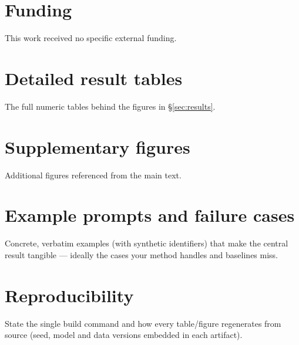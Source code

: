 \documentclass[11pt]{article}
\begin{document}
\section*{Funding}
This work received no specific external funding.

\appendix
\section{Detailed result tables}\label{app:tables}
The full numeric tables behind the figures in \S\ref{sec:results}.

\section{Supplementary figures}\label{app:figs}
Additional figures referenced from the main text.

\section{Example prompts and failure cases}\label{app:examples}
Concrete, verbatim examples (with synthetic identifiers) that make the central result
tangible — ideally the cases your method handles and baselines miss.

\section{Reproducibility}
State the single build command and how every table/figure regenerates from source
(seed, model and data versions embedded in each artifact).

\clearpage



\end{document}
